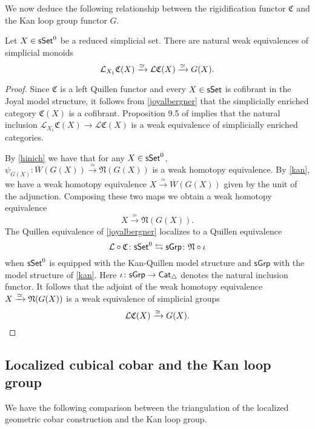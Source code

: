 We now deduce the following relationship between the rigidification functor $\mathfrak{C}$ and the Kan loop group functor $G$.

\begin{proposition} \label{CandG}
	Let $X \in \mathsf{sSet}^0$ be a reduced simplicial set.
	There are natural weak equivalences of simplicial monoids
	$$\mathcal{L}_{X_1} \mathfrak{C}(X) \xrightarrow{\simeq} \mathcal{L}\mathfrak{C}(X) \xrightarrow{\simeq} G(X).$$
\end{proposition}

\begin{proof}
	Since $\mathfrak{C}$ is a left Quillen functor and every $X \in \mathsf{sSet}$ is cofibrant in the Joyal model structure, it follows from \cref{joyalbergner} that the simplicially enriched category $\mathfrak{C}(X)$ is a cofibrant.
	Proposition 9.5 of \cite{dwyer1980simplicial} implies that the natural inclusion $\mathcal{L}_{X_1} \mathfrak{C}(X) \to \mathcal{L}\mathfrak{C}(X)$ is a weak equivalence of simplicially enriched categories.
	
	By \cref{hinich} we have that for any $X \in \mathsf{sSet}^0$, $\psi_{G(X)} \colon \overline{W}(G(X)) \xrightarrow{\simeq} \mathfrak{N}(G(X))$ is a weak homotopy equivalence.
	By \cref{kan}, we have a weak homotopy equivalence $X \xrightarrow{\simeq} \overline{W}(G(X))$ given by the unit of the adjunction.
	Composing these two maps we obtain a weak homotopy equivalence
	$$X \xrightarrow{\simeq} \mathfrak{N}(G(X)).$$ 
	The Quillen equivalence of \cref{joyalbergner} localizes to a Quillen equivalence
	$$\mathcal{L} \circ \mathfrak{C} \colon \mathsf{sSet}^0 \leftrightarrows \mathsf{sGrp} \colon \mathfrak{N} \circ \iota$$
	when $\mathsf{sSet}^0$ is equipped with the Kan-Quillen model structure and $\mathsf{sGrp}$ with the model structure of \cref{kan}.
	Here $\iota \colon \mathsf{sGrp} \to \mathsf{Cat}_{\triangle}$ denotes the natural inclusion functor.
	It follows that the adjoint of the weak homotopy equivalence $X \xrightarrow{\simeq} \mathfrak{N}(G(X))$ is a weak equivalence of simplicial groups
	$$\mathcal{L}\mathfrak{C}(X) \xrightarrow{\simeq} G(X).$$ 
\end{proof}

\subsection{Localized cubical cobar and the Kan loop group}

We have the following comparison between the triangulation of the localized geometric cobar construction and the Kan loop group.

